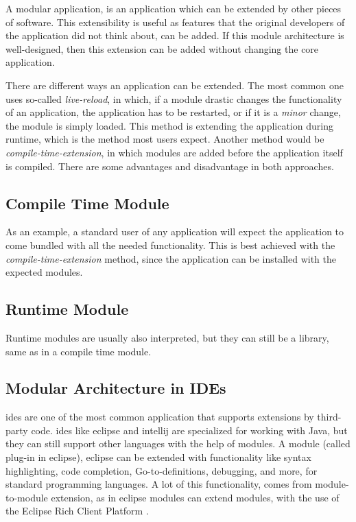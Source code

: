 A modular application, is an application which can be extended by other pieces
of software. This extensibility is useful as features that the original
developers of the application did not think about, can be added. If this module
architecture is well-designed, then this extension can be added without changing
the core application.

There are different ways an application can be extended. The most common one
uses so-called \textit{live-reload}, in which, if a module drastic changes the
functionality of an application, the application has to be restarted, or if it
is a \textit{minor} change, the module is simply loaded. This method is
extending the application during runtime, which is the method most users
expect. Another method would be \textit{compile-time-extension}, in which
modules are added before the application itself is compiled. There are some
advantages and disadvantage in both approaches.

\subsection{Compile Time Module}

As an example, a standard user of any application will expect the application to
come bundled with all the needed functionality. This is best achieved with the
\textit{compile-time-extension} method, since the application can be installed
with the expected modules.

\subsection{Runtime Module}

Runtime modules are usually also interpreted, but they can still be a
library, same as in a compile time module.

\subsection{Modular Architecture in IDEs}

\gls{ide}s are one of the most common application that supports extensions by
third-party code. \gls{ide}s like \gls{eclipse} and \gls{intellij} are
specialized for working with Java, but they can still support other languages
with the help of modules. A module (called plug-in in \gls{eclipse}),
\gls{eclipse} can be extended with functionality like syntax highlighting, code
completion, Go-to-definitions, debugging, and more, for standard programming
languages. A lot of this functionality, comes from module-to-module extension,
as in \gls{eclipse} modules can extend modules, with the use of the Eclipse Rich
Client Platform \cite{eclipseRcp}.

